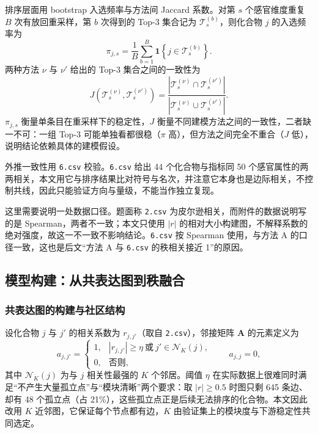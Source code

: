﻿\documentclass[UTF8,a4paper,zihao=-4]{ctexart}
\numberwithin{figure}{section}
\numberwithin{table}{section}
\numberwithin{equation}{section}
\newcommand{\file}[1]{\texttt{#1}}
\newcommand{\bA}{\bm{A}}
\begin{document}
排序层面用 bootstrap 入选频率与方法间 Jaccard 系数。对第 $s$ 个感官维度重复 $B$ 次有放回重采样，第 $b$ 次得到的 Top-3 集合记为 $\mathcal{T}_s^{(b)}$，则化合物 $j$ 的入选频率为
\begin{equation}
\pi_{j,s}=\frac{1}{B}\sum_{b=1}^{B}\mathbf{1}\left\{j\in\mathcal{T}_s^{(b)}\right\}.
\label{eq:freq}
\end{equation}
两种方法 $\nu$ 与 $\nu'$ 给出的 Top-3 集合之间的一致性为
\begin{equation}
J\left(\mathcal{T}_s^{(\nu)},\mathcal{T}_s^{(\nu')}\right)=
\frac{\left|\mathcal{T}_s^{(\nu)}\cap\mathcal{T}_s^{(\nu')}\right|}
{\left|\mathcal{T}_s^{(\nu)}\cup\mathcal{T}_s^{(\nu')}\right|}.
\label{eq:jaccard}
\end{equation}
$\pi_{j,s}$ 衡量单条目在重采样下的稳定性，$J$ 衡量不同建模方法之间的一致性，二者缺一不可：一组 Top-3 可能单独看都很稳（$\pi$ 高），但方法之间完全不重合（$J$ 低），说明结论依赖具体的建模假设。

外推一致性用 \file{6.csv} 校验。\file{6.csv} 给出 44 个化合物与指标同 50 个感官属性的两两相关，本文用它与排序结果比对符号与名次，并注意它本身也是边际相关，不控制共线，因此只能验证方向与量级，不能当作独立复现。

这里需要说明一处数据口径。题面称 \file{2.csv} 为皮尔逊相关，而附件的数据说明写的是 Spearman，两者不一致；本文只使用 $|r|$ 的相对大小构建图，不解释系数的绝对强度，故这一不一致不影响结论。\file{6.csv} 按 Spearman 使用，与方法 A 的口径一致，这也是后文“方法 A 与 \file{6.csv} 的秩相关接近 1”的原因。

\subsection{模型构建：从共表达图到秩融合}

\subsubsection{共表达图的构建与社区结构}

设化合物 $j$ 与 $j'$ 的相关系数为 $r_{j,j'}$（取自 \file{2.csv}），邻接矩阵 $\bA$ 的元素定义为
\begin{equation}
a_{j,j'}=\begin{cases}1, & \left|r_{j,j'}\right|\ge\eta\ \text{或}\ j'\in\mathcal{N}_K(j),\\ 0, & \text{否则},\end{cases}\qquad a_{j,j}=0,
\label{eq:adj}
\end{equation}
其中 $\mathcal{N}_K(j)$ 为与 $j$ 相关性最强的 $K$ 个邻居。阈值 $\eta$ 在实际数据上很难同时满足“不产生大量孤立点”与“模块清晰”两个要求：取 $|r|\ge0.5$ 时图只剩 645 条边、却有 48 个孤立点（占 21\%），这些孤立点正是后续无法排序的化合物。本文因此改用 $K$ 近邻图，它保证每个节点都有边，$K$ 由验证集上的模块度与下游稳定性共同选定。
\end{document}
